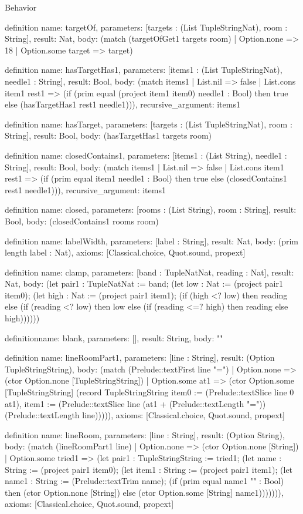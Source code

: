 \begin{lexlean}{Behavior}
\begin{semanticmodule}
definition{
  name: targetOf,
  parameters: [targets : (List TupleStringNat), room : String],
  result: Nat,
  body: (match (targetOfGet1 targets room) | Option.none => 18 | Option.some target => target)
}

definition{
  name: hasTargetHas1,
  parameters: [items1 : (List TupleStringNat), needle1 : String],
  result: Bool,
  body: (match items1
    | List.nil => false
    | List.cons item1 rest1 => (if (prim equal (project item1 item0) needle1 : Bool) then true else (hasTargetHas1 rest1 needle1))),
  recursive_argument: items1
}

definition{
  name: hasTarget,
  parameters: [targets : (List TupleStringNat), room : String],
  result: Bool,
  body: (hasTargetHas1 targets room)
}

definition{
  name: closedContains1,
  parameters: [items1 : (List String), needle1 : String],
  result: Bool,
  body: (match items1
    | List.nil => false
    | List.cons item1 rest1 => (if (prim equal item1 needle1 : Bool) then true else (closedContains1 rest1 needle1))),
  recursive_argument: items1
}

definition{
  name: closed,
  parameters: [rooms : (List String), room : String],
  result: Bool,
  body: (closedContains1 rooms room)
}

definition{
  name: labelWidth,
  parameters: [label : String],
  result: Nat,
  body: (prim length label : Nat),
  axioms: [Classical.choice, Quot.sound, propext]
}

definition{
  name: clamp,
  parameters: [band : TupleNatNat, reading : Nat],
  result: Nat,
  body: (let pair1 : TupleNatNat := band; (let low : Nat := (project pair1 item0); (let high : Nat := (project pair1 item1); (if (high <? low) then reading else (if (reading <? low) then low else (if (reading <=? high) then reading else high))))))
}

definition{name: blank, parameters: [], result: String, body: ""}

definition{
  name: lineRoomPart1,
  parameters: [line : String],
  result: (Option TupleStringString),
  body: (match (Prelude::textFirst line "=")
    | Option.none => (ctor Option.none [TupleStringString])
    | Option.some at1 => (ctor Option.some [TupleStringString] (record TupleStringString {item0 := (Prelude::textSlice line 0 at1), item1 := (Prelude::textSlice line (at1 + (Prelude::textLength "=")) (Prelude::textLength line))}))),
  axioms: [Classical.choice, Quot.sound, propext]
}

definition{
  name: lineRoom,
  parameters: [line : String],
  result: (Option String),
  body: (match (lineRoomPart1 line)
    | Option.none => (ctor Option.none [String])
    | Option.some tried1 => (let pair1 : TupleStringString := tried1; (let name : String := (project pair1 item0); (let item1 : String := (project pair1 item1); (let name1 : String := (Prelude::textTrim name); (if (prim equal name1 "" : Bool) then (ctor Option.none [String]) else (ctor Option.some [String] name1))))))),
  axioms: [Classical.choice, Quot.sound, propext]
}


\end{semanticmodule}
\end{lexlean}
